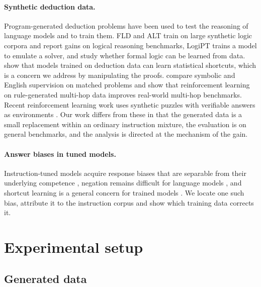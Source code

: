 \documentclass{article}
\begin{document}
\paragraph{Synthetic deduction data.} Program-generated deduction problems
have been used to test the reasoning of language models
\citep{clark2020transformers, tafjord2021proofwriter, saparov2023language,
saparov2023ood, zhu2024dyval} and to train them. FLD and ALT
\citep{morishita2023fld, morishita2024alt} train on large synthetic logic
corpora and report gains on logical reasoning benchmarks, LogiPT
\citep{feng2024logipt} trains a model to emulate a solver, and
\citet{xia2025formallogic} study whether formal logic can be learned from
data. \citet{zhang2023paradox} show that models trained on deduction data
can learn statistical shortcuts, which is a concern we address by
manipulating the proofs. \citet{zhou2025finelogic} compare symbolic and
English supervision on matched problems and \citet{kabra2026synthetic} show
that reinforcement learning on rule-generated multi-hop data improves
real-world multi-hop benchmarks. Recent reinforcement learning work uses
synthetic puzzles with verifiable answers as environments
\citep{xie2025logicrl, liu2025synlogic, chen2025enigmata,
stojanovski2025reasoninggym}. Our work differs from these in that the
generated data is a small replacement within an ordinary instruction
mixture, the evaluation is on general benchmarks, and the analysis is
directed at the mechanism of the gain.

\paragraph{Answer biases in tuned models.} Instruction-tuned models acquire
response biases that are separable from their underlying competence
\citep{ouyang2022training}, negation remains difficult for language models
\citep{kassner2020negated, hosseini2021understanding, truong2023language},
and shortcut learning is a general concern for trained models
\citep{geirhos2020shortcut}. We locate one such bias, attribute it to the
instruction corpus and show which training data corrects it.

\section{Experimental setup}
\label{sec:setup}

\subsection{Generated data}
\label{sec:data}
\end{document}
